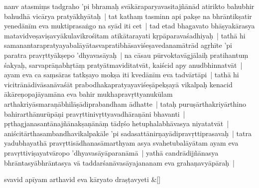 \documentclass[article,12pt,a4paper]{memoir}%
\newcommand{\persName}[1]{#1}
\newcounter{parCount}
\begin{document}
	  \pstart \leavevmode%
	\label{thakur75-137.6}nanv atasmiṃs tadgraho 'pi bhramaḥ svā\label{capv-np-10a-end}\label{capv-np-10b-start}kāraparyavasitajñānād atirikto bahubhir bahudhā vicārya pratyākhyātaḥ | tat kathaṃ tasminn api pakṣe na bhrāntikṣatir yenedānīm eva muktiprasaṅgo na syād iti cet | tad etad bhagavato \persName{bhāṣyakārasya} matavidveṣaviṣavyākulavikrośitam atikātarayati kṛpāparavaśadhiyaḥ | tathā hi samanantarapratyayabalāyātasvapratibhāsaviśeṣavedanamātrād agṛhīte 'pi paratra pravṛttyākṣepo 'dhyavasāyaḥ | na cāsau pūrvoktavāgjālaiḥ pratihantuṃ śakyaḥ, sarvaprāṇabhṛtāṃ pratyātmaviditatvāt, kaiścid apy anudbhinnatvāt | ayam eva ca saṃsāras tatkṣayo mokṣa iti kvedānīm eva tadvārtāpi | tathā hi vicitrānādivāsanāvaśāt prabodhakapratyayaviśeṣāpekṣayā vikalpaḥ kenacid ākāreṇopajāyamāna eva bahir mukhapravṛttyanukūlam arthakriyāsmaraṇābhilāṣādiprabandham ādhatte | tataḥ puruṣārthakriyārthino bahirarthānurūpāṇi pravṛttinivṛttyavadhāraṇāni bhavanti | pṛthagjanasantānajñāna\label{ratnakīrtinibandhāvali__36r1PF7IMS1N1FWQDPUYFL9R0TC}kṣaṇānāṃ\label{ratnakīrtinibandhāvali__36r1PF7IMRZL0VOIHDHNC5NEYNP} tādṛśo hetuphalabhāvasya niyatatvāt | aniścitārthasambandhavikalpakāle 'pi sada\label{capv-np-10b-end}sattānirṇayādipravṛttiprasavaḥ | tatra yadubhayathā pravṛttisādhanasāmarthyam asya svahetubalāyātam ayam eva pravṛttiviṣayatvāropo 'dhyavasāyāparanāmā | yathā candrādijñānasya bhrāntasyābhrāntasya vā taddarśanāvasāyajananam eva grahaṇavyāpāraḥ |
	{}
	\pend%
      
	    
	    \stanza[\smallbreak]
	  svavid apīyam arthavid eva kāryato draṣṭavyeti \&[\smallbreak]
	  
	  
	  
\end{document}
